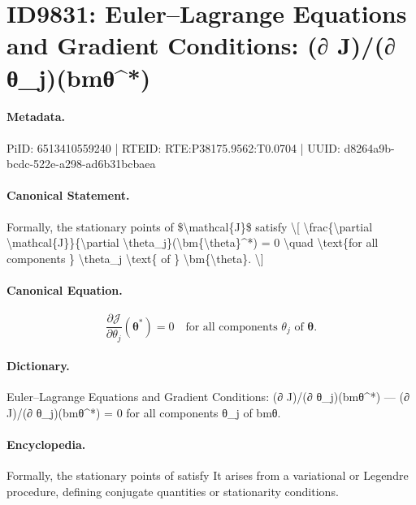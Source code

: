 \section*{ID9831: Euler–Lagrange Equations and Gradient Conditions: (∂ J)/(∂ θ\_j)(bmθ\textasciicircum{}*)}
\paragraph{Metadata.}
PiID: 6513410559240 | RTEID: RTE:P38175.9562:T0.0704 | UUID: d8264a9b-bcdc-522e-a298-ad6b31bcbaea

\paragraph{Canonical Statement.}
Formally, the stationary points of \$\textbackslash{}mathcal\{J\}\$ satisfy \textbackslash{}[ \textbackslash{}frac\{\textbackslash{}partial \textbackslash{}mathcal\{J\}\}\{\textbackslash{}partial \textbackslash{}theta\_j\}(\textbackslash{}bm\{\textbackslash{}theta\}\textasciicircum{}*) = 0 \textbackslash{}quad \textbackslash{}text\{for all components \} \textbackslash{}theta\_j \textbackslash{}text\{ of \} \textbackslash{}bm\{\textbackslash{}theta\}. \textbackslash{}]

\paragraph{Canonical Equation.}
\[
\frac{\partial \mathcal{J}}{\partial \theta_j}(\bm{\theta}^*) = 0 \quad \text{for all components } \theta_j \text{ of } \bm{\theta}.
\]

\paragraph{Dictionary.}
Euler–Lagrange Equations and Gradient Conditions: (∂ J)/(∂ θ\_j)(bmθ\textasciicircum{}*) — (∂ J)/(∂ θ\_j)(bmθ\textasciicircum{}*) = 0 for all components θ\_j of bmθ.

\paragraph{Encyclopedia.}
Formally, the stationary points of satisfy It arises from a variational or Legendre procedure, defining conjugate quantities or stationarity conditions.
